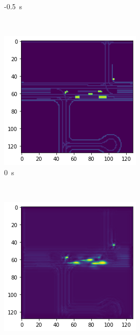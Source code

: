 \documentclass[12pt]{article}
\begin{document}
\begin{figure}[H]
\begin{subfigure}[b]{0.18\textwidth}
                \caption{-0.5~s}
            \end{subfigure}
            ~
            \begin{subfigure}[b]{0.18\textwidth}
                \includegraphics[width=\textwidth]{output_low_dens_2.png}
                \caption{0~s}
            \end{subfigure}
            ~
            \begin{subfigure}[b]{0.18\textwidth}
                \includegraphics[width=\textwidth]{output_low_dens_3.png}

\end{subfigure}
\end{figure}
\end{document}
